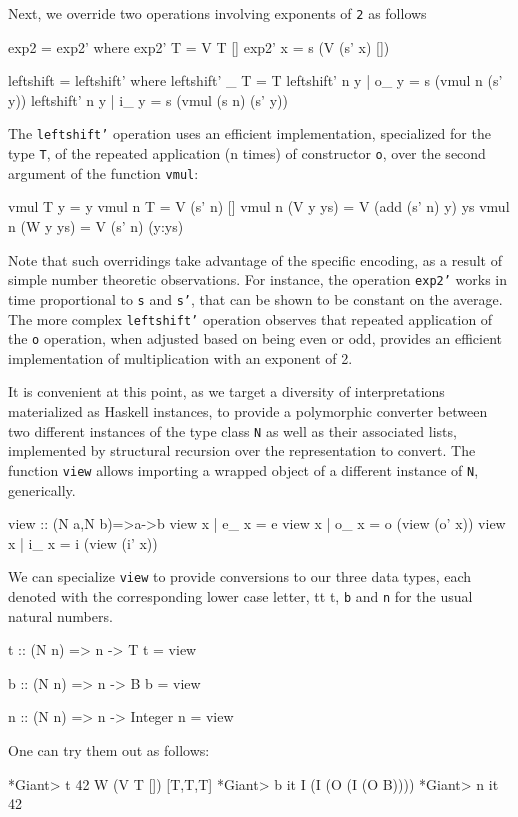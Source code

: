\documentclass{TOOLS/llncs}
\begin{document}
Next, we override two operations involving exponents of  {\tt 2} as follows
\begin{code}
  exp2 = exp2' where
    exp2' T = V T []
    exp2' x = s (V (s' x) [])

  leftshift = leftshift' where
    leftshift' _ T = T
    leftshift' n y | o_ y = s (vmul n (s' y))
    leftshift' n y | i_ y = s (vmul (s n) (s' y))
\end{code}
The {\tt leftshift'} operation uses
an efficient implementation, specialized for the type {\tt T}, of the
repeated application (n times) of constructor {\tt o}, over the second argument
of the function {\tt vmul}:
\begin{code}
vmul T y = y
vmul n T = V (s' n) []
vmul n (V y ys) = V (add (s' n) y) ys
vmul n (W y ys) = V (s' n) (y:ys)
\end{code}

Note that such overridings take advantage of the specific encoding, as a result
of simple number theoretic observations. For instance, the operation
{\tt exp2'} works in time proportional to {\tt s} and {\tt s'}, that can be shown to
be constant on the average. The more complex {\tt leftshift'} operation observes
that repeated application of the {\tt o} operation, when adjusted 
based on being even or odd, provides an efficient implementation of multiplication
with an exponent of 2.

It is convenient at this point, as we target a diversity of interpretations
materialized as Haskell instances, to provide a polymorphic converter between
two different instances of the type class {\tt N} as well as their
associated lists, implemented by structural recursion over the representation
to convert. The function {\tt view} allows importing a wrapped
object of a different instance of {\tt N}, generically.
\begin{code}
view :: (N a,N b)=>a->b
view x | e_ x = e
view x | o_ x = o (view (o' x))
view x | i_ x = i (view (i' x))
\end{code}

We can specialize {\tt view} to provide conversions to
our three data types, each denoted with the corresponding
lower case letter, {tt t}, {\tt b} and {\tt n} for the usual natural numbers.
\begin{code}
t :: (N n) => n -> T
t = view

b :: (N n) => n -> B
b = view

n :: (N n) => n -> Integer
n = view
\end{code}
One can try them out as follows:
\begin{codex}
*Giant> t 42
W (V T []) [T,T,T]
*Giant> b it
I (I (O (I (O B))))
*Giant> n it
42
\end{codex}
\end{document}
